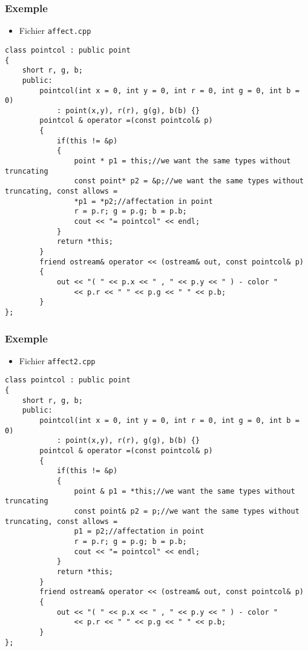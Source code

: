 \begin{frame}[containsverbatim]
\frametitle{Exemple}
\begin{itemize}
\item Fichier \texttt{affect.cpp}
\end{itemize}
\begin{lstlisting}
class pointcol : public point
{
	short r, g, b;	
	public:
		pointcol(int x = 0, int y = 0, int r = 0, int g = 0, int b = 0) 
			: point(x,y), r(r), g(g), b(b) {}		
		pointcol & operator =(const pointcol& p)
		{
			if(this != &p)
			{					
				point * p1 = this;//we want the same types without truncating
				const point* p2 = &p;//we want the same types without truncating, const allows =
				*p1 = *p2;//affectation in point
				r = p.r; g = p.g; b = p.b;
				cout << "= pointcol" << endl;
			}
			return *this;
		}
		friend ostream& operator << (ostream& out, const pointcol& p)
		{
			out << "( " << p.x << " , " << p.y << " ) - color " 
			    << p.r << " " << p.g << " " << p.b;
		}
};
\end{lstlisting}
\end{frame}

\begin{frame}[containsverbatim]
\frametitle{Exemple}
\begin{itemize}
\item Fichier \texttt{affect2.cpp}
\end{itemize}
\begin{lstlisting}
class pointcol : public point
{
	short r, g, b;	
	public:
		pointcol(int x = 0, int y = 0, int r = 0, int g = 0, int b = 0) 
			: point(x,y), r(r), g(g), b(b) {}		
		pointcol & operator =(const pointcol& p)
		{
			if(this != &p)
			{					
				point & p1 = *this;//we want the same types without truncating
				const point& p2 = p;//we want the same types without truncating, const allows =
				p1 = p2;//affectation in point
				r = p.r; g = p.g; b = p.b;
				cout << "= pointcol" << endl;
			}
			return *this;
		}
		friend ostream& operator << (ostream& out, const pointcol& p)
		{
			out << "( " << p.x << " , " << p.y << " ) - color " 
			    << p.r << " " << p.g << " " << p.b;
		}
};
\end{lstlisting}
\end{frame}

